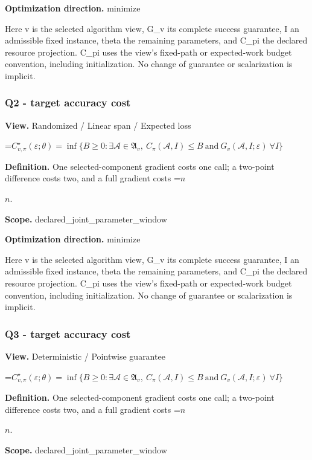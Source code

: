\documentclass[10pt,a4paper]{article}
\newcommand{\AtlasMath}[1]{\par\begingroup\centering\setbox0=\hbox{$\displaystyle #1$}\ifdim\wd0>1.4\linewidth\typeout{ATLAS WIDE FORMULA: \the\wd0}\fi\ifdim\wd0>\linewidth\resizebox{\linewidth}{!}{\box0}\else\box0\fi\par\endgroup}
\newcommand{\AtlasInlineMath}[1]{\begingroup\setbox0=\hbox{$#1$}\ifdim\wd0>.4\linewidth\endgroup\AtlasMath{#1}\else\endgroup$#1$\fi}
\begin{document}
\textbf{Optimization direction.} minimize

Here v is the selected algorithm view, G\_\allowbreak{}v its complete success guarantee, I an admissible fixed instance, theta the remaining parameters, and C\_\allowbreak{}pi the declared resource projection. C\_\allowbreak{}pi uses the view's fixed-path or expected-work budget convention, including initialization. No change of guarantee or scalarization is implicit.

\subsubsection{Q2 - target accuracy cost}
\textbf{View.} Randomized / Linear span / Expected loss

\AtlasMath{C^\star_{v,\pi}(\varepsilon;\theta)=\inf\{B\ge0:\exists\mathcal A\in\mathfrak A_v,\ C_\pi(\mathcal A,I)\le B\ \text{and}\ G_v(\mathcal A,I;\varepsilon)\ \forall I\}}
\textbf{Definition.} One selected-component gradient costs one call; a two-point difference costs two, and a full gradient costs \AtlasInlineMath{n}.

\textbf{Scope.} declared\_\allowbreak{}joint\_\allowbreak{}parameter\_\allowbreak{}window

\textbf{Optimization direction.} minimize

Here v is the selected algorithm view, G\_\allowbreak{}v its complete success guarantee, I an admissible fixed instance, theta the remaining parameters, and C\_\allowbreak{}pi the declared resource projection. C\_\allowbreak{}pi uses the view's fixed-path or expected-work budget convention, including initialization. No change of guarantee or scalarization is implicit.

\subsubsection{Q3 - target accuracy cost}
\textbf{View.} Deterministic / Pointwise guarantee

\AtlasMath{C^\star_{v,\pi}(\varepsilon;\theta)=\inf\{B\ge0:\exists\mathcal A\in\mathfrak A_v,\ C_\pi(\mathcal A,I)\le B\ \text{and}\ G_v(\mathcal A,I;\varepsilon)\ \forall I\}}
\textbf{Definition.} One selected-component gradient costs one call; a two-point difference costs two, and a full gradient costs \AtlasInlineMath{n}.

\textbf{Scope.} declared\_\allowbreak{}joint\_\allowbreak{}parameter\_\allowbreak{}window
\end{document}
